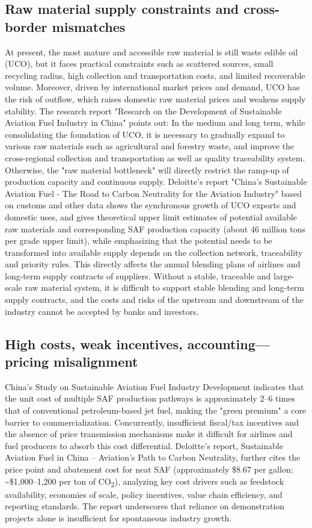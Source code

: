 \documentclass[a4paper,11pt]{article}
\begin{document}
\subsection{Raw material supply constraints and cross-border mismatches}
At present, the most mature and accessible raw material is still waste edible oil (UCO), but it faces practical constraints such as scattered sources, small recycling radius, high collection and transportation costs, and limited recoverable volume. Moreover, driven by international market prices and demand, UCO has the risk of outflow, which raises domestic raw material prices and weakens supply stability. The research report "Research on the Development of Sustainable Aviation Fuel Industry in China" points out: In the medium and long term, while consolidating the foundation of UCO, it is necessary to gradually expand to various raw materials such as agricultural and forestry waste, and improve the cross-regional collection and transportation as well as quality traceability system. Otherwise, the "raw material bottleneck" will directly restrict the ramp-up of production capacity and continuous supply. Deloitte's report "China's Sustainable Aviation Fuel - The Road to Carbon Neutrality for the Aviation Industry" based on customs and other data shows the synchronous growth of UCO exports and domestic uses, and gives theoretical upper limit estimates of potential available raw materials and corresponding SAF production capacity (about 46 million tons per grade upper limit), while emphasizing that the potential needs to be transformed into available supply depends on the collection network, traceability and priority rules. This directly affects the annual blending plans of airlines and long-term supply contracts of suppliers. Without a stable, traceable and large-scale raw material system, it is difficult to support stable blending and long-term supply contracts, and the costs and risks of the upstream and downstream of the industry cannot be accepted by banks and investors.

\subsection{High costs, weak incentives, accounting---pricing misalignment}
China's Study on Sustainable Aviation Fuel Industry Development indicates that the unit cost of multiple SAF production pathways is approximately 2--6 times that of conventional petroleum-based jet fuel, making the "green premium" a core barrier to commercialization. Concurrently, insufficient fiscal/tax incentives and the absence of price transmission mechanisms make it difficult for airlines and fuel producers to absorb this cost differential. Deloitte's report, Sustainable Aviation Fuel in China -- Aviation's Path to Carbon Neutrality, further cites the price point and abatement cost for neat SAF (approximately \$8.67 per gallon; \textasciitilde\$1,000--1,200 per ton of CO\textsubscript{2}), analyzing key cost drivers such as feedstock availability, economies of scale, policy incentives, value chain efficiency, and reporting standards. The report underscores that reliance on demonstration projects alone is insufficient for spontaneous industry growth.
\end{document}
